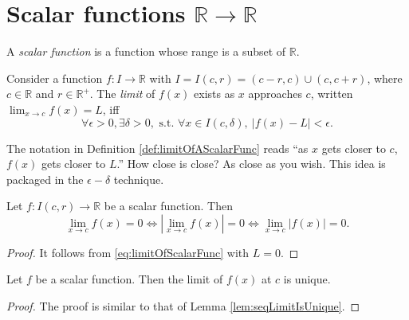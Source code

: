 \section{Scalar functions
  $\mathbb{R}\rightarrow\mathbb{R}$}
\label{sec:cont-funct-on-R}

\begin{defn}
  A \emph{scalar function} is a function
   whose range is a subset of $\mathbb{R}$.
\end{defn}

\begin{defn}
  \label{def:limitOfAScalarFunc}
  Consider a function $f: I\rightarrow \mathbb{R}$
  with $I=I(c,r)=(c-r,c)\cup (c,c+r)$, where $c\in \mathbb{R}$
  and $r\in \mathbb{R}^{+}$.
  The \emph{limit} of $f(x)$  exists
   as $x$ approaches $c$, written
     $\lim_{x\rightarrow c} f(x) = L$,
  iff 
  \begin{equation}
    \label{eq:limitOfScalarFunc}
 \forall \epsilon>0, \exists \delta>0, \text{ s.t. }
    \forall x\in I(c,\delta),\ |f(x)-L|<\epsilon.
  \end{equation}
\end{defn}

\begin{rem}
  The notation in Definition \ref{def:limitOfAScalarFunc}
  reads ``as $x$ gets closer to $c$,
 $f(x)$ gets closer to $L$.''
How close is close?
As close as you wish.
This idea is packaged in the $\epsilon-\delta$ technique.
\end{rem}

\begin{lem}
  \label{lem:funcCvTo0IsEqulvalentToAbsoluteFuncCvTo}
  Let $f:I(c,r)\rightarrow \mathbb{R}$ be a scalar function. Then
  \begin{displaymath}
    \lim_{x\rightarrow c}f(x)=0
    \iff \left| \lim_{x\rightarrow c}f(x) \right|=0
    \iff \lim_{x\rightarrow c} |f(x)|=0.
  \end{displaymath}
\end{lem}
\begin{proof}
  It follows from \eqref{eq:limitOfScalarFunc} with $L=0$.
\end{proof}

\begin{lem}
  \label{lem:funcLimitIsUnique}
  Let $f$ be a scalar function. Then the limit of $f(x)$ at $c$
  is unique.
\end{lem}
\begin{proof}
  The proof is similar to that of Lemma \ref{lem:seqLimitIsUnique}.
\end{proof}

